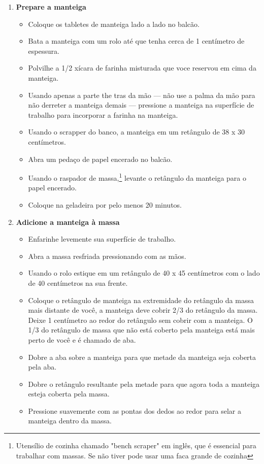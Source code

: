 \documentclass [11pt, letterpaper] {article}
\begin{document}
\begin {description}
\begin {enumerate}
\item {\bf Prepare a manteiga}
\begin {itemize}
\item Coloque os tabletes de manteiga lado a lado no balcão.
\item Bata a manteiga com um rolo até que tenha cerca de 1 cent\'imetro de espessura.
\item Polvilhe a 1/2 xícara de farinha misturada que voce reservou em cima da manteiga.
\item Usando apenas a parte the tras da m\~ao --- não use a palma da mão para n\~ao derreter a manteiga demais --- pressione a manteiga na superfície de trabalho para incorporar a farinha na manteiga.
\item Usando o scrapper do banco, a manteiga em um retângulo de 38 x 30 cent\'imetros.
\item Abra um pedaço de papel encerado no balcão.
\item Usando o raspador de massa,\footnote{Utens\'ilio de cozinha chamado "bench scraper" em ingl\^es, que \'e essencial para trabalhar com massas. Se n\~ao tiver pode usar uma faca grande de cozinha} levante o retângulo da manteiga para o papel encerado.
\item Coloque na geladeira por pelo menos 20 minutos.
\end {itemize}
\item {\bf Adicione a manteiga à massa}
\begin {itemize}
\item Enfarinhe levemente sua superfície de trabalho.
\item Abra a massa resfriada pressionando com as mãos.
\item Usando o rolo estique em um retângulo de 40 x 45 cent\'imetros com o lado de 40 cent\'imetros na sua frente. 
\item Coloque o retângulo de manteiga na extremidade do retângulo da massa mais distante de você, a manteiga deve cobrir 2/3 do retângulo da massa. Deixe 1 cent\'imetro  ao redor do retângulo sem cobrir com a manteiga. O 1/3 do retângulo de massa que não está coberto pela manteiga está mais perto de você e é chamado de aba.
\item Dobre a aba sobre a manteiga para que metade da manteiga seja coberta pela aba.
\item Dobre o retângulo resultante pela metade para que agora toda a manteiga esteja coberta pela massa.
\item Pressione suavemente com as pontas dos dedos ao redor para selar a manteiga dentro da massa.

\end{itemize}
\end{enumerate}
\end{description}
\end{document}
